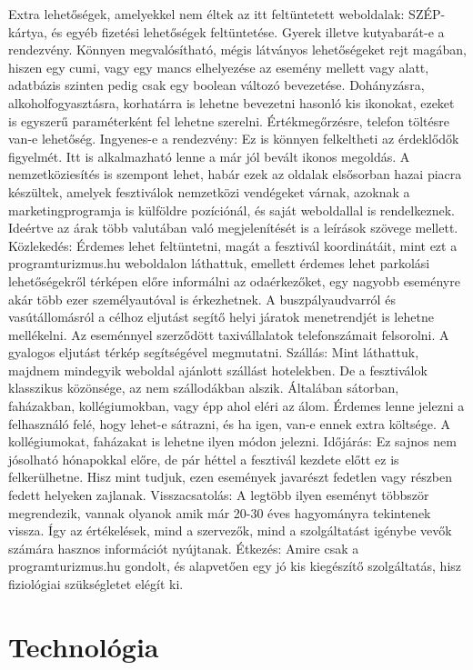 \documentclass[11pt]{article}
\begin{document}
Extra lehetőségek, amelyekkel nem éltek az itt feltüntetett weboldalak: 
SZÉP-kártya, és egyéb fizetési lehetőségek feltüntetése.
Gyerek illetve kutyabarát-e a rendezvény. Könnyen megvalósítható, mégis látványos lehetőségeket rejt magában, hiszen egy cumi, vagy egy mancs elhelyezése az esemény mellett vagy alatt, adatbázis szinten pedig csak egy boolean változó bevezetése.
Dohányzásra, alkoholfogyasztásra, korhatárra is lehetne bevezetni hasonló kis ikonokat, ezeket is egyszerű paraméterként fel lehetne szerelni.
Értékmegőrzésre, telefon töltésre van-e lehetőség. 
Ingyenes-e a rendezvény: Ez is könnyen felkeltheti az érdeklődők figyelmét. Itt is alkalmazható lenne a már jól bevált ikonos megoldás.
A nemzetköziesítés is szempont lehet, habár ezek az oldalak elsősorban hazai piacra készültek, amelyek fesztiválok nemzetközi vendégeket várnak, azoknak a marketingprogramja is külföldre pozíciónál, és saját weboldallal is rendelkeznek. Ideértve az árak több valutában való megjelenítését is a leírások szövege mellett.
Közlekedés: Érdemes lehet feltüntetni, magát a fesztivál koordinátáit, mint ezt a programturizmus.hu weboldalon láthattuk, emellett érdemes lehet parkolási lehetőségekről térképen előre informálni az odaérkezőket, egy nagyobb eseményre akár több ezer személyautóval is érkezhetnek. A buszpályaudvarról és vasútállomásról a célhoz eljutást segítő helyi járatok menetrendjét is lehetne mellékelni. Az eseménnyel szerződött taxivállalatok telefonszámait felsorolni. A gyalogos eljutást térkép segítségével megmutatni.
Szállás: Mint láthattuk, majdnem mindegyik weboldal ajánlott szállást hotelekben. De a fesztiválok klasszikus közönsége, az nem szállodákban alszik. Általában sátorban, faházakban, kollégiumokban, vagy épp ahol eléri az álom. Érdemes lenne jelezni a felhasználó felé, hogy lehet-e sátrazni, és ha igen, van-e ennek extra költsége. A kollégiumokat, faházakat is lehetne ilyen módon jelezni.
Időjárás: Ez sajnos nem jósolható hónapokkal előre, de pár héttel a fesztivál kezdete előtt ez is felkerülhetne. Hisz mint tudjuk, ezen események javarészt fedetlen vagy részben fedett helyeken zajlanak.
Visszacsatolás: A legtöbb ilyen eseményt többször megrendezik, vannak olyanok amik már 20-30 éves hagyományra tekintenek vissza. Így az értékelések, mind a szervezők, mind a szolgáltatást igénybe vevők számára hasznos információt nyújtanak.
Étkezés: Amire csak a programturizmus.hu gondolt, és alapvetően egy jó kis kiegészítő szolgáltatás, hisz fiziológiai szükségletet elégít ki.

\section{Technológia}
\end{document}
